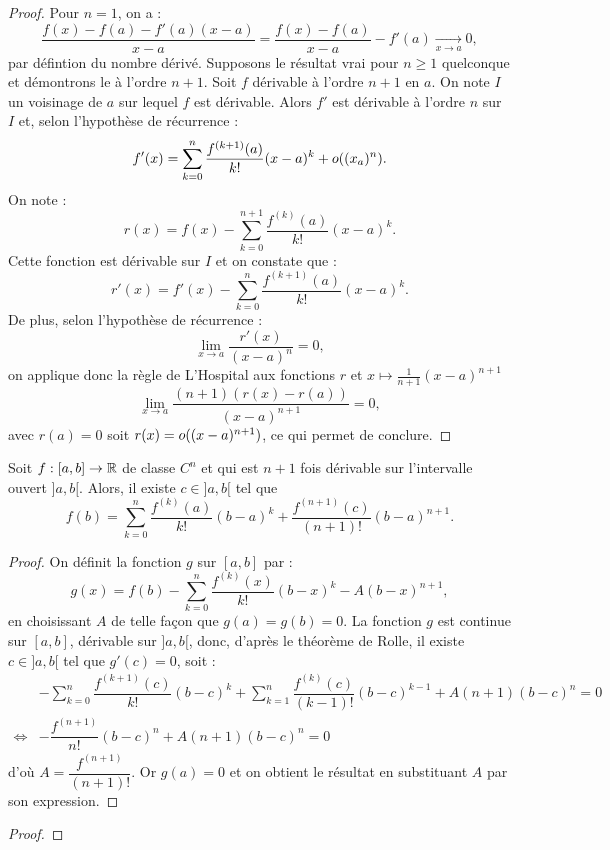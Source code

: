 \documentclass{article}
\begin{document}
\begin{proof}
Pour $n=1$, on a :
\[ \dfrac{f(x) - f(a) - f'(a)(x-a)}{x-a} = \dfrac{f(x) - f(a)}{x-a} - f'(a) \underset{x \to a}\to 0 , \]
par défintion du nombre dérivé.
Supposons le résultat vrai pour $n \geq 1$ quelconque et démontrons le à l'ordre $n+1$. 
Soit $f$ dérivable à l'ordre $n+1$ en $a$. On note $I$ un voisinage de $a$ sur lequel $f$ est dérivable.
Alors $f'$ est dérivable à l'ordre $n$ sur $I$ et, selon l'hypothèse de récurrence :
\[ f'(x) = \sum_{k=0}^n \dfrac{f^{(k+1)}(a)}{k!}(x-a)^k + o ((x_a)^n) . \]
On note :
\[ r(x) = f(x) - \sum_{k=0}^{n+1} \dfrac{f^{(k)}(a)}{k!}(x-a)^k . \]
Cette fonction est dérivable sur $I$ et on constate que :
\[ r'(x) = f'(x) - \sum_{k=0}^{n} \dfrac{f^{(k+1)}(a)}{k!}(x-a)^k . \]
De plus, selon l'hypothèse de récurrence :
\[ \lim_{x \to a} \dfrac{r'(x)}{(x-a)^n} = 0 , \]
on applique donc la règle de L'Hospital aux fonctions $r$ et $x \mapsto \frac1{n+1} (x-a)^{n+1}$
\[ \lim_{x \to a} \dfrac{(n+1)(r(x)-r(a))}{(x-a)^{n+1}} = 0 , \]
avec $r(a) = 0$ soit $r(x) = o ((x-a)^{n+1})$, ce qui permet de conclure.
\end{proof}

\begin{thm}
Soit $f:[a,b] \to \mathbb{R}$ de classe $C^n$ et qui est $n+1$ fois dérivable sur l'intervalle ouvert $]a,b[$. Alors, il existe $c \in ]a,b[$ tel que
\[ f(b) = \sum_{k=0}^n \dfrac{f^{(k)}(a)}{k!} (b-a)^k + \dfrac{f^{(n+1)}(c)}{(n+1)!} (b-a)^{n+1} . \]
\end{thm}
 
\begin{proof}
On définit la fonction $g$ sur $[a,b]$ par :
\[ g(x) = f(b) - \sum_{k=0}^n \dfrac{f^{(k)}(x)}{k!} (b-x)^k - A(b-x)^{n+1} , \]
en choisissant $A$ de telle façon que $g(a)=g(b)=0$. La fonction $g$ est continue sur $[a,b]$, dérivable sur $]a,b[$, donc, d'après le
théorème de Rolle, il existe $c \in ]a,b[$ tel que $g'(c) = 0$, soit :
\begin{align*}
& - \sum_{k=0}^n \dfrac{f^{(k+1)}(c)}{k!} (b-c)^k + \sum_{k=1}^n \dfrac{f^{(k)}(c)}{(k-1)!} (b-c)^{k-1} + A(n+1)(b-c)^n = 0 \\
\iff & - \dfrac{f^{(n+1)}}{n!} (b-c)^n + A(n+1)(b-c)^n = 0 
\end{align*}
d'où $A = \dfrac{f^{(n+1)}}{(n+1)!}$. Or $g(a)=0$ et on obtient le résultat en substituant $A$ par son expression.
\end{proof}

\begin{thm}

\end{thm}
 
\begin{proof}
 
\end{proof}
\end{document}
